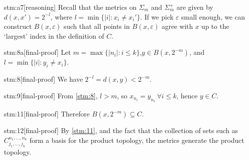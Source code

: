 \begin{stm}{stm:a7}[reasoning]
Recall that the metrics on $\Sigma_m$ and $\Sigma_m^+$ are given by $d(x,x') = 2^{-l}$, where $l = \min \{ |i| : x_i \ne x_i' \}$. If we pick $\varepsilon$ small enough, we can construct $B(x, \varepsilon)$ such that all points in $B(x, \varepsilon)$ agree with $x$ up to the ‘largest’ index in the definition of $C$.
\end{stm}

\begin{stm}{stm:8a}[final-proof]
Let $m = \max \{ |n_i| : i \leq k \}$,$y \in B(x, 2^{-m})$, and $l = \min \{ |i| : y_i \ne x_i \}$. 
\end{stm}

\begin{stm}{stm:8}[final-proof]
We have $2^{-l} = d(x,y) < 2^{-m}$.
\end{stm}

\begin{stm}{stm:9}[final-proof]
From \ref{stm:8}, $l > m$, so $x_{n_i} = y_{n_i} \ \forall i \leq k$, hence $y \in C$.
\end{stm}

\begin{stm}{stm:11}[final-proof]
Therefore $B(x, 2^{-m}) \subseteq C$.
\end{stm}

\begin{stm}{stm:12}[final-proof]
By \ref{stm:11}, and the fact that the collection of sets such as $C_{j_1,\ldots,j_k}^{n_1,\ldots,n_k}$ form a basis for the product topology, the metrics generate the product topology.
\end{stm}